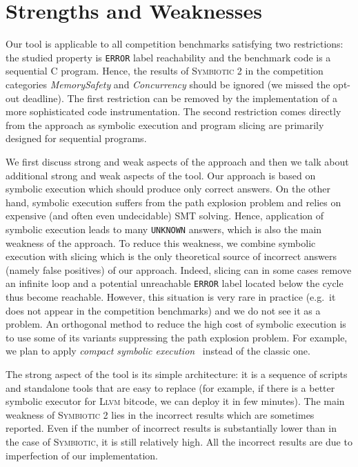 \documentclass[10pt]{llncs}
\newcommand\tool{\textsc{Symbiotic}\xspace}
\begin{document}

\section{Strengths and Weaknesses}

Our tool is applicable to all competition benchmarks satisfying two
restrictions: the studied property is \texttt{ERROR} label reachability and
the benchmark code is a sequential C program. Hence, the results of \tool 2
in the competition categories \emph{MemorySafety} and \emph{Concurrency}
should be ignored (we missed the opt-out deadline). The first restriction
can be removed by the implementation of a more sophisticated code
instrumentation.  The second restriction comes directly from the approach as
symbolic execution and program slicing are primarily designed for sequential
programs.

\medskip We first discuss strong and weak aspects of the approach and then
we talk about additional strong and weak aspects of the tool. Our approach
is based on symbolic execution which should produce only correct answers. On
the other hand, symbolic execution suffers from the path explosion problem
and relies on expensive (and often even undecidable) SMT solving. Hence,
application of symbolic execution leads to many \texttt{UNKNOWN} answers,
which is also the main weakness of the approach. To reduce this weakness, we
combine symbolic execution with slicing which is the only theoretical source
of incorrect answers (namely false positives) of our approach. Indeed,
slicing can in some cases remove an infinite loop and a potential
unreachable \texttt{ERROR} label located below the cycle thus become
reachable. However, this situation is very rare in practice (e.g.~it does
not appear in the competition benchmarks) and we do not see it as a problem.
An orthogonal method to reduce the high cost of symbolic execution is to use
some of its variants suppressing the path explosion problem. For example, we
plan to apply \emph{compact symbolic execution}~\cite{CSE} instead of the
classic one.

The strong aspect of the tool is its simple architecture: it is a sequence
of scripts and standalone tools that are easy to replace (for example, if
there is a better symbolic executor for \textsc{Llvm} bitcode, we can deploy
it in few minutes). The main weakness of \tool 2 lies in the incorrect
results which are sometimes reported.  Even if the number of incorrect
results is substantially lower than in the case of \tool, it is still
relatively high.  All the incorrect results are due to imperfection of our
implementation.
\end{document}
